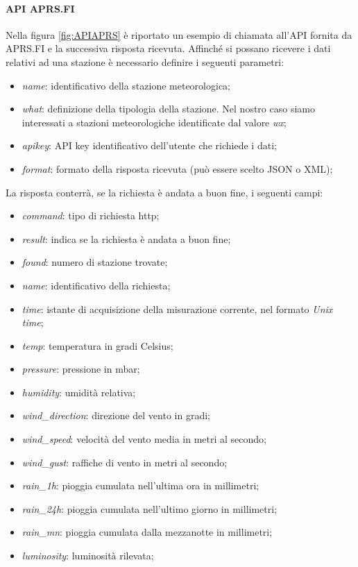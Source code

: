 \paragraph{API APRS.FI}\label{par:APRSAPI}
Nella figura \Fig\ref{fig:APIAPRS} è riportato un esempio di chiamata all'API fornita da APRS.FI e la successiva risposta ricevuta.
Affinché si possano ricevere i dati relativi ad una stazione è necessario definire i seguenti parametri:
\begin{itemize}
	\item \textit{name}: identificativo della stazione meteorologica;
	\item \textit{what}: definizione della tipologia della stazione. Nel nostro caso siamo interessati a stazioni meteorologiche identificate dal valore \textit{wx};
	\item \textit{apikey}: API key identificativo dell'utente che richiede i dati;
	\item \textit{format}: formato della risposta ricevuta (può essere scelto JSON o XML);
\end{itemize}
La risposta conterrà, se la richiesta è andata a buon fine, i seguenti campi:
\begin{itemize}
	\item \textit{command}: tipo di richiesta http;
	\item \textit{result}: indica se la richiesta è andata a buon fine;
	\item \textit{found}: numero di stazione trovate;
	\item \textit{name}: identificativo della richiesta;
	\item \textit{time}: istante di acquisizione della misurazione corrente, nel formato \textit{Unix time};
	\item \textit{temp}: temperatura in gradi Celsius;
	\item \textit{pressure}: pressione in mbar;
	\item \textit{humidity}: umidità relativa;
	\item \textit{wind\_direction}: direzione del vento in gradi;
	\item \textit{wind\_speed}: velocità del vento media in metri al secondo;
	\item \textit{wind\_gust}: raffiche di vento in metri al secondo;
	\item \textit{rain\_1h}: pioggia cumulata nell'ultima ora in millimetri;
	\item \textit{rain\_24h}: pioggia cumulata nell'ultimo giorno in millimetri;
	\item \textit{rain\_mn}: pioggia cumulata dalla mezzanotte in millimetri;
	\item \textit{luminosity}: luminosità rilevata;
\end{itemize}

